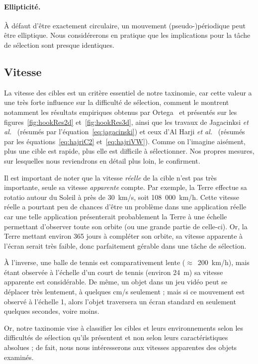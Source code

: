     \paragraph{Ellipticité.}
    À défaut d'être exactement circulaire, un mouvement (pseudo-)périodique peut être elliptique. Nous considérerons en pratique que les implications pour la tâche de sélection sont presque identiques.
    
    \subsection{Vitesse}
    La vitesse des cibles est un critère essentiel de notre taxinomie, car cette valeur a une très forte influence sur la difficulté de sélection, comment le montrent notamment les résultats empiriques obtenus par Ortega~\cite{ortega2013hook} et présentés sur les figures~\ref{fig:hookRes2d} et~\ref{fig:hookRes3d}, ainsi que les travaux de Jagacinksi \emph{et al.}~\cite{jagacinski1980test} (résumés par l'équation~\ref{eq:jagacinski}) et ceux d'Al Harji \emph{et al.}~\cite{hajri2011moving} (résumés par les équations~\ref{eq:hajriC2} et~\ref{eq:hajriVW}). Comme on l'imagine aisément, plus une cible est rapide, plus elle est difficile à sélectionner. Nos propres mesures, sur lesquelles nous reviendrons en détail plus loin, le confirment.
    
    Il est important de noter que la vitesse \emph{réelle} de la cible n'est pas très importante, seule sa vitesse \emph{apparente} compte. Par exemple, la Terre effectue sa rotatio autour du Soleil à près de 30~km/s, soit 108~000~km/h. Cette vitesse réelle a pourtant peu de chances d'être un problème dans une application réelle car une telle application présenterait probablement la Terre à une échelle permettant d'observer toute son orbite (ou une grande partie de celle-ci). Or, la Terre mettant environ 365 jours à compléter son orbite, sa vitesse apparente à l'écran serait très faible, donc parfaitement gérable dans une tâche de sélection.
    
    À l'inverse, une balle de tennis est comparativement lente ($\approx$~200~km/h), mais étant observée à l'échelle d'un court de tennis (environ 24~m) sa vitesse apparente est considérable. De même, un objet dans un jeu vidéo peut se déplacer très lentement, à quelques cm/s seulement ; mais si ce mouvement est observé à l'échelle 1, alors l'objet traversera un écran standard en seulement quelques secondes, voire moins.
    
    Or, notre taxinomie vise à classifier les cibles et leurs environnements selon les difficultés de sélection qu'ils présentent et non selon leurs caractéristiques absolues ; de fait, nous nous intéresserons aux vitesses apparentes des objets examinés.
    
